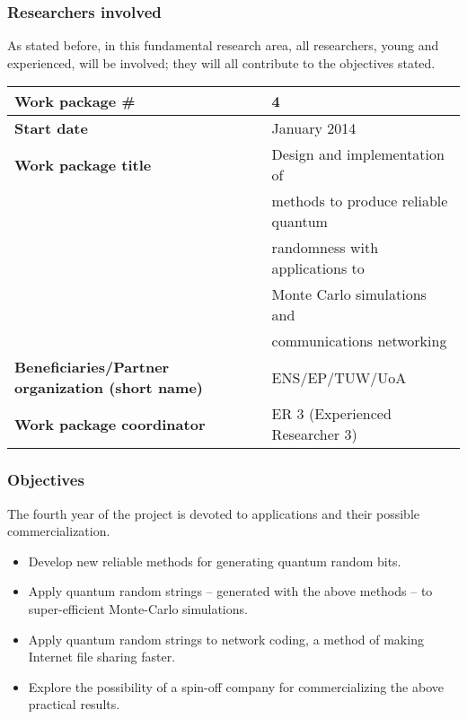 \documentclass[12pt]{article}
\begin{document}
\subsubsection*{Researchers involved}

As stated before,
in this fundamental research area,
all researchers, young and experienced, will be involved; they will all contribute to the objectives stated.






\begin{center}
{
\begin{tabular}{|l|l|}
\hline
{\bf Work  package \#}&4\\
\hline
{\bf Start date}&January 2014\\
\hline
{\bf Work  package title}&Design and implementation of \\&   methods to produce reliable quantum  \\& randomness
with applications to\\
& Monte Carlo simulations and\\
& communications networking\\
\hline
{\bf Beneficiaries/Partner organization (short name)}&ENS/EP/TUW/UoA\\
\hline
{\bf Work  package coordinator}&ER 3 (Experienced Researcher 3)\\
\hline
\end{tabular}
}
\end{center}

\subsubsection*{Objectives}

The fourth year of the project is devoted to applications and their possible commercialization.

\begin{itemize}
\item Develop new reliable methods for generating quantum random bits.
\item Apply quantum random strings -- generated with the above methods -- to super-efficient  Monte-Carlo simulations.
\item Apply quantum random strings to network coding, a method of making Internet file sharing faster.
\item Explore the possibility of a spin-off company for commercializing the above practical results.
\end{itemize}
\end{document}
